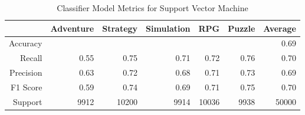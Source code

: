 \begin{table}[h]
    \centering
    \begin{tabular}{r|r|r|r|r|r|r}
        & Adventure & Strategy & Simulation & RPG & Puzzle & Average \\\hline
        Accuracy    &  &  &  &  &  & 0.69\\
        Recall      & 0.55 & 0.75 & 0.71 & 0.72 & 0.76 & 0.70\\
        Precision   & 0.63 & 0.72 & 0.68 & 0.71 & 0.73 & 0.69\\
        F1 Score    & 0.59 & 0.74 & 0.69 & 0.71 & 0.75 & 0.70\\
        Support     & 9912 & 10200 & 9914 & 10036 & 9938 & 50000
\end{tabular}
    \caption{Classifier Model Metrics for Support Vector Machine}
    \label{tab:model_metrics}
\end{table}